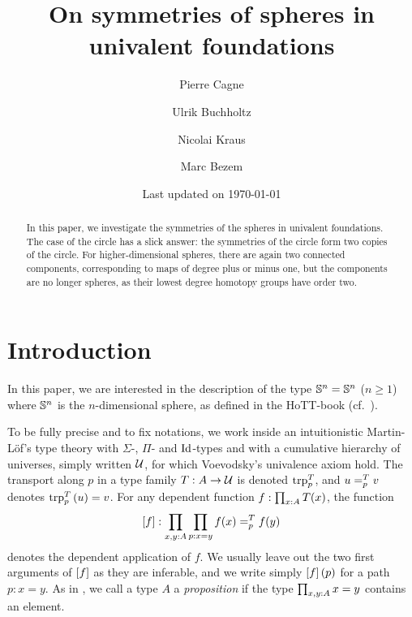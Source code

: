 \documentclass[english,a4paper]{lmcs}
\begin{document}
\title{On symmetries of spheres in univalent foundations}

\author{Pierre Cagne}
\address{Universitetet i Bergen}

\author{Ulrik Buchholtz}
\address{Technische Universit\"at Darmstadt}

\author{Nicolai Kraus}
\address{University of Nottingham}

\author{Marc Bezem}
\address{Universitetet i Bergen}

\date{\normalsize Last updated on \today}%

\begin{abstract}
  In this paper, we investigate the symmetries of the spheres in
  univalent foundations.  The case of the circle has a slick answer:
  the symmetries of the circle form two copies of the circle. For
  higher-dimensional spheres, there are again two connected
  components, corresponding to maps of degree plus or minus one, but
  the components are no longer spheres, as their lowest degree
  homotopy groups have order two.
\end{abstract}

\maketitle

\section{Introduction}

In this paper, we are interested in the description of the type
$\Sn n = \Sn n$ ($n\geq 1$) where $\Sn n$ is the $n$-dimensional
sphere, as defined in the HoTT-book (cf.~\cite{HoTT}).

To be fully precise and to fix notations, we work inside an
intuitionistic Martin-Löf's type theory with $\Sigma$-, $\Pi$- and
$\Id$-types and with a cumulative hierarchy of universes,
simply written $\UU$, for which Voevodsky's univalence axiom hold. The
transport along $p$ in a type family $T:A\to \UU$ is denoted
$\trp [T] p$, and $\pathover u T p v$ denotes $\trp [T] p {(u)} = v$.
For any dependent function $f\from\prod_{x\from A}T(x)$,
the function
\begin{displaymath}
  \ap f:\prod_{x,y\from A}\prod_{p\from x=y} \pathover {f(x)} T p
  {f(y)}
\end{displaymath}
denotes the dependent application of $f$. We usually leave out the two
first arguments of $\ap f$ as they are inferable, and we write simply
$\ap f (p)$ for a path $p:x=y$. As in \cite{HoTT}, we call a type $A$
a \emph{proposition} if the type $\prod_{x,y\from A} x=y$ contains an
element.
\end{document}
